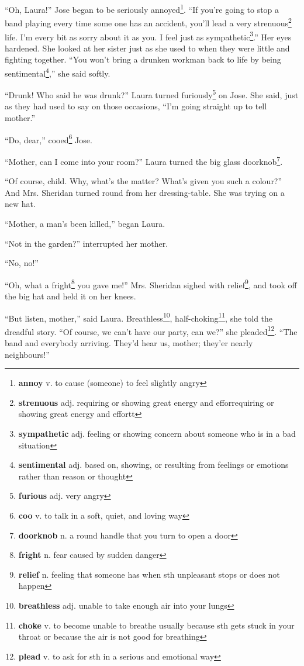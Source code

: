 ``Oh, Laura!'' Jose began to be seriously annoyed\footnote{\textbf{annoy} v. to cause (someone) to feel slightly angry}. ``If you're going to stop a band playing every time some one has an accident, you'll lead a very strenuous\footnote{\textbf{strenuous} adj. requiring or showing great energy and efforrequiring or showing great energy and effortt} life. I'm every bit as sorry about it as you. I feel just as sympathetic\footnote{\textbf{sympathetic} adj. feeling or showing concern about someone who is in a bad situation}.'' Her eyes hardened. She looked at her sister just as she used to when they were little and fighting together. ``You won't bring a drunken workman back to life by being sentimental\footnote{\textbf{sentimental} adj. based on, showing, or resulting from feelings or emotions rather than reason or thought},'' she said softly.

``Drunk! Who said he was drunk?'' Laura turned furiously\footnote{\textbf{furious} adj. very angry} on Jose. She said, just as they had used to say on those occasions, ``I'm going straight up to tell mother.''

``Do, dear,'' cooed\footnote{\textbf{coo} v. to talk in a soft, quiet, and loving way} Jose.

``Mother, can I come into your room?'' Laura turned the big glass doorknob\footnote{\textbf{doorknob} n. a round handle that you turn to open a door}.

``Of course, child. Why, what's the matter? What's given you such a colour?'' And Mrs. Sheridan turned round from her dressing-table. She was trying on a new hat.

``Mother, a man's been killed,'' began Laura.

``Not in the garden?'' interrupted her mother.

``No, no!''

``Oh, what a fright\footnote{\textbf{fright} n. fear caused by sudden danger} you gave me!'' Mrs. Sheridan sighed with relief\footnote{\textbf{relief} n. feeling that someone has when sth unpleasant stops or does not happen}, and took off the big hat and held it on her knees.

``But listen, mother,'' said Laura. Breathless\footnote{\textbf{breathless} adj. unable to take enough air into your lungs}, half-choking\footnote{\textbf{choke} v. to become unable to breathe usually because sth gets stuck in your throat or because the air is not good for breathing}, she told the dreadful story. ``Of course, we can't have our party, can we?'' she pleaded\footnote{\textbf{plead} v. to ask for sth in a serious and emotional way}. ``The band and everybody arriving. They'd hear us, mother; they'er nearly neighbours!''


